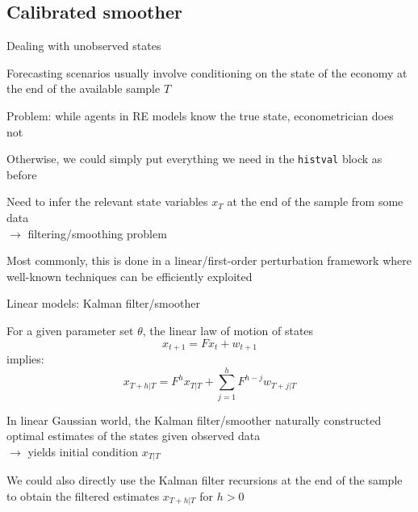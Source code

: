 \documentclass[handout,usepdftitle=false,xcolor=dvipsnames,aspectratio=169]{beamer}
\begin{document}
\subsection{Calibrated smoother}

\begin{frame}{Dealing with unobserved states}
  \begin{witemize}
    \item Forecasting scenarios usually involve conditioning on the state of the economy at the end of the available sample $T$
    \item Problem: while agents in RE models know the true state, econometrician does not
    \item Otherwise, we could simply put everything we need in the \texttt{histval} block as before
    \item Need to infer the relevant state variables $x_{T}$ at the end of the sample from some data\\
    $\rightarrow$ filtering/smoothing problem
    \item Most commonly, this is done in a linear/first-order perturbation framework where well-known techniques can be efficiently exploited
  \end{witemize}
\end{frame}

\begin{frame}{Linear models: Kalman filter/smoother}
  \begin{witemize}
    \item For a given parameter set $\theta$, the linear law of motion of states
    \begin{equation}
      x_{t + 1} = F x_t + w_{t + 1}
    \end{equation}
    implies:
    \begin{equation}
      x_{T+h|T} = F^h x_{T|T} + \sum_{j=1}^h F^{h-j} w_{T+j|T}
    \end{equation}
    \item In linear Gaussian world, the Kalman filter/smoother naturally constructed optimal estimates of the states given observed data\\
    $\rightarrow$ yields initial condition $x_{T|T}$
    \item We could also directly use the Kalman filter recursions at the end of the sample to obtain the filtered estimates $x_{T+h|T}$ for $h>0$

  \end{witemize}
\end{frame}
\end{document}
